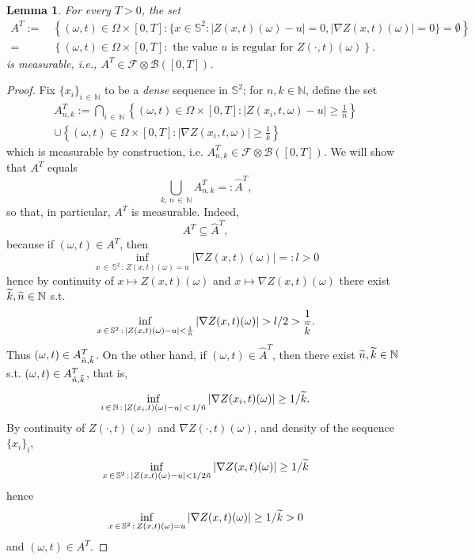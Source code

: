 \documentclass[10pt]{amsart}
\newtheorem{lemm}[theo]{Lemma}\newtheorem{prop}[theo]{Proposition}\newtheorem{coro}[theo]{Corollary}\newtheorem{conj}[theo]{Conjecture}
\theoremstyle{definition}\newtheorem{defi}[theo]{Definition}\newtheorem{rema}[theo]{Remark}\newtheorem{exam}[theo]{Example}\newtheorem{exem}[theo]{Example}\newtheorem{nota}[theo]{Notation}
\newcommand{\clF}{\mathcal{F}}
\newcommand{\clB}{\mathcal{B}}
\newcommand{\bbS}{\mathbb{S}}
\newcommand{\bbN}{\mathbb{N}}
\let\oldtilde\tilde
\renewcommand*{\tilde}[1]{\mathchoice{\widetilde{#1}}{\widetilde{#1}}{\oldtilde{#1}}{\oldtilde{#1}}}
\begin{document}
\begin{lemm}\label{lemmeas}
For every $T>0$, the set
\begin{align*}
A^T {:=}&\, \left \{ (\omega, t)\in \Omega\times [0,T]: \{ x\in
\bbS^2 : |Z(x,t)(\omega) - u | =0, |\nabla Z(x,t)(\omega) |=0\} =\emptyset \right \} \\
=&\,\left\{ (\omega, t)\in \Omega \times [0,T] : \text{ the value } u \text{ is regular for } Z(\cdot, t)(\omega)\right\}.
\end{align*}
is measurable, i.e., $A^T\in \clF\otimes \clB([0,T])$.
\end{lemm}

\begin{proof}
Fix $\{x_i\}_{i\,\in\,\bbN}$ to be a \emph{dense} sequence in $\bbS^2$; for $n,k\in \bbN$, define the set
\begin{multline}
A^T_{n,k}:= \bigcap_{i\,\in\,\bbN} \left\{ (\omega, t)\in \Omega\times [0,T]: |Z(x_i, t, \omega) - u | \ge \frac{1}{n} \right \} \\
\cup \left \{(\omega, t)\in \Omega\times [0,T] : |\nabla Z(x_i, t, \omega)| \ge \frac{1}{k} \right \}
\end{multline}
which is measurable by construction, i.e. $A^T_{n,k}\in \mathcal F\otimes \mathcal B([0,T])$. We will show that $A^T$ equals
\begin{equation}
\bigcup_{k,\,n\,\in\,\bbN} A^T_{n,k} =: \widehat A^T,
\end{equation}
so that, in particular, $A^T$ is measurable. Indeed,
\begin{equation}
A^T\subseteq \widehat A^T,
\end{equation}
because if $(\omega,t)\in A^T$, then
\begin{equation}
\inf_{x\,\in\,\bbS^2\,:\,Z(x,t)(\omega)=u} |\nabla Z(x,t)(\omega)| =: l >0
\end{equation}
hence by continuity of $x\mapsto Z(x,t)(\omega)$ and $x\mapsto \nabla Z(x,t)(\omega)$ there exist $\tilde k, \tilde n\in \bbN$ s.t.
\begin{equation}
\inf_{x\,\in\,\bbS^2\,:\,|Z(x,t)(\omega) - u| < \frac{1}{\tilde n}} |\nabla Z(x,t)(\omega)| > l/2 > \frac{1}{\tilde k}.
\end{equation}
Thus $(\omega,t)\in A^T_{\tilde n, \tilde k}$. On the other hand, if $(\omega,t)\in \widehat A^T$, then there exist $\tilde n, \tilde k\in \bbN$ s.t. $(\omega,t)\in A^T_{\tilde n, \tilde k}$, that is,
\begin{equation}
\inf_{i\,\in\,\bbN\,:\,|Z(x_i, t)(\omega) - u|\,<\,1/\tilde n} |\nabla Z(x_i, t)(\omega) | \ge 1/\tilde k.
\end{equation}
By continuity of $Z(\cdot,t)(\omega)$ and $\nabla Z(\cdot, t)(\omega)$, and density of the sequence $\{ x_i\}_i$,
\begin{equation}
\inf_{x\,\in\,\bbS^2\,:\,|Z(x, t)(\omega) - u|< 1/2\tilde n} |\nabla Z(x, t)(\omega) | \ge 1/\tilde k
\end{equation}
hence
\begin{equation}
\inf_{x\,\in\,\bbS^2\,:\,Z(x, t)(\omega) = u} |\nabla Z(x, t)(\omega) | \ge 1/\tilde k >0
\end{equation}
and $(\omega,t)\in A^T$.
\end{proof}
\end{document}
